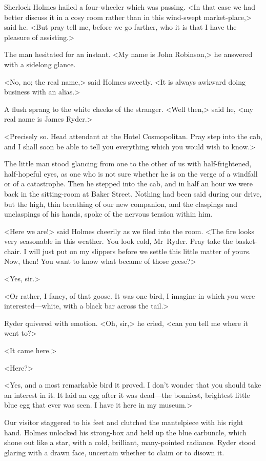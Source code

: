 Sherlock Holmes hailed a four-wheeler which was passing. <In that case we had better discuss it in a cosy room rather than in this wind-swept market-place,> said he. <But pray tell me, before we go farther, who it is that I have the pleasure of assisting.>

The man hesitated for an instant. <My name is John Robinson,> he answered with a sidelong glance.

<No, no; the real name,> said Holmes sweetly. <It is always awkward doing business with an alias.>

A flush sprang to the white cheeks of the stranger. <Well then,> said he, <my real name is James Ryder.>

<Precisely so. Head attendant at the Hotel Cosmopolitan. Pray step into the cab, and I shall soon be able to tell you everything which you would wish to know.>

The little man stood glancing from one to the other of us with half-frightened, half-hopeful eyes, as one who is not sure whether he is on the verge of a windfall or of a catastrophe. Then he stepped into the cab, and in half an hour we were back in the sitting-room at Baker Street. Nothing had been said during our drive, but the high, thin breathing of our new companion, and the claspings and unclaspings of his hands, spoke of the nervous tension within him.

<Here we are!> said Holmes cheerily as we filed into the room. <The fire looks very seasonable in this weather. You look cold, Mr~Ryder. Pray take the basket-chair. I will just put on my slippers before we settle this little matter of yours. Now, then! You want to know what became of those geese?>

<Yes, sir.>

<Or rather, I fancy, of that goose. It was one bird, I imagine in which you were interested—white, with a black bar across the tail.>

Ryder quivered with emotion. <Oh, sir,> he cried, <can you tell me where it went to?>

<It came here.>

<Here?>

<Yes, and a most remarkable bird it proved. I don't wonder that you should take an interest in it. It laid an egg after it was dead—the bonniest, brightest little blue egg that ever was seen. I have it here in my museum.>

Our visitor staggered to his feet and clutched the mantelpiece with his right hand. Holmes unlocked his strong-box and held up the blue carbuncle, which shone out like a star, with a cold, brilliant, many-pointed radiance. Ryder stood glaring with a drawn face, uncertain whether to claim or to disown it.

